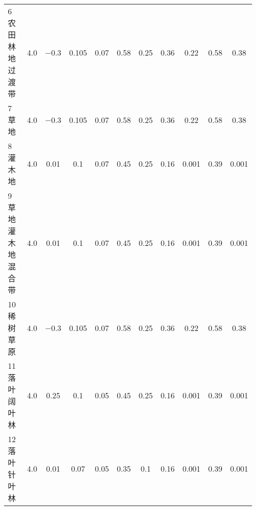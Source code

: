 \begin{landscape}
\begin{table}[htbp]
\begin{tabular}{@{}lcccccccccc@{}}
      6 农田林地过渡带          & 4.0              & \num{ -0.3  }         & 0.105                    & 0.07                     & 0.58                     & 0.25                     & 0.36                     & 0.22                     & 0.58                     & 0.38                    \\
      7 草地                    & 4.0              & \num{ -0.3  }         & 0.105                    & 0.07                     & 0.58                     & 0.25                     & 0.36                     & 0.22                     & 0.58                     & 0.38                    \\
      8 灌木地                  & 4.0              & \num{ 0.01  }         & 0.1                      & 0.07                     & 0.45                     & 0.25                     & 0.16                     & 0.001                    & 0.39                     & 0.001                   \\
      9 草地灌木地混合带        & 4.0              & \num{ 0.01  }         & 0.1                      & 0.07                     & 0.45                     & 0.25                     & 0.16                     & 0.001                    & 0.39                     & 0.001                   \\
      10 稀树草原               & 4.0              & \num{ -0.3  }         & 0.105                    & 0.07                     & 0.58                     & 0.25                     & 0.36                     & 0.22                     & 0.58                     & 0.38                    \\
      11 落叶阔叶林             & 4.0              & \num{ 0.25  }         & 0.1                      & 0.05                     & 0.45                     & 0.25                     & 0.16                     & 0.001                    & 0.39                     & 0.001                   \\
      12 落叶针叶林             & 4.0              & \num{ 0.01  }         & 0.07                     & 0.05                     & 0.35                     & 0.1                      & 0.16                     & 0.001                    & 0.39                     & 0.001                   \\ %
%

\end{tabular}
\end{table}
\end{landscape}
